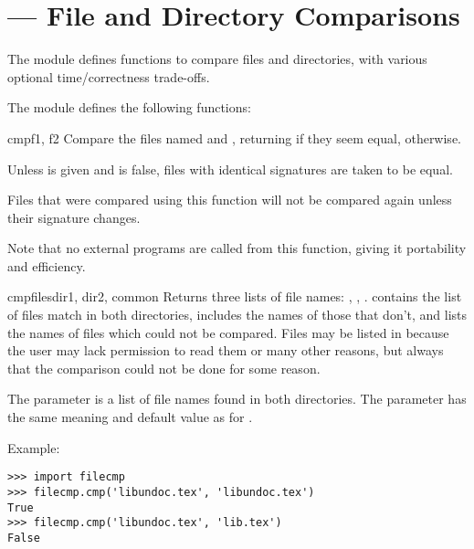 \section{ ---
         File and Directory Comparisons}



The  module defines functions to compare files and
directories, with various optional time/correctness trade-offs.

The  module defines the following functions:

\begin{funcdesc}{cmp}{f1, f2}
Compare the files named  and , returning  if
they seem equal,  otherwise.

Unless  is given and is false, files with identical
 signatures are taken to be equal.

Files that were compared using this function will not be compared again
unless their  signature changes.

Note that no external programs are called from this function, giving it
portability and efficiency.
\end{funcdesc}

\begin{funcdesc}{cmpfiles}{dir1, dir2, common}
Returns three lists of file names: , ,
.   contains the list of files match in both
directories,  includes the names of those that don't,
and  lists the names of files which could not be
compared.  Files may be listed in  because the user may
lack permission to read them or many other reasons, but always that
the comparison could not be done for some reason.

The  parameter is a list of file names found in both directories.
The  parameter has the same
meaning and default value as for .
\end{funcdesc}

Example:

\begin{verbatim}
>>> import filecmp
>>> filecmp.cmp('libundoc.tex', 'libundoc.tex')
True
>>> filecmp.cmp('libundoc.tex', 'lib.tex')
False
\end{verbatim}


